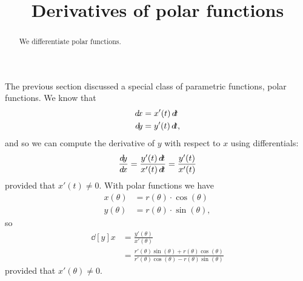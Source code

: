\documentclass{ximera}
\title[Dig-In:]{Derivatives of polar functions}
\begin{document}
\begin{abstract}
  We differentiate polar functions.
\end{abstract}
\maketitle

The previous section discussed a special class of parametric functions,
polar functions.  We know that
\begin{align*}
  \d x &= x'(t) \d t\\
  \d y &= y'(t) \d t,
\end{align*}
and so we can compute the derivative of $y$ with respect to $x$ using
differentials:
\[
\frac{\d y}{\d x} = \frac{y'(t) \d t}{x'(t) \d t} = \frac{y'(t)}{x'(t)}
\]
provided that $x'(t) \ne 0$.  With polar functions we have
\begin{align*}
  x(\theta) &= r(\theta) \cdot \cos(\theta)\\
  y(\theta) &= r(\theta) \cdot \sin(\theta),
\end{align*}
so
\begin{align*}
\dd[y]{x} &= \frac{y'(\theta)}{x'(\theta)} \\
&= \frac{r'(\theta)\sin(\theta)+r(\theta)\cos(\theta)}{r'(\theta)\cos(\theta)-r(\theta)\sin(\theta)}
\end{align*}
provided that $x'(\theta)\ne 0$.
\end{document}
